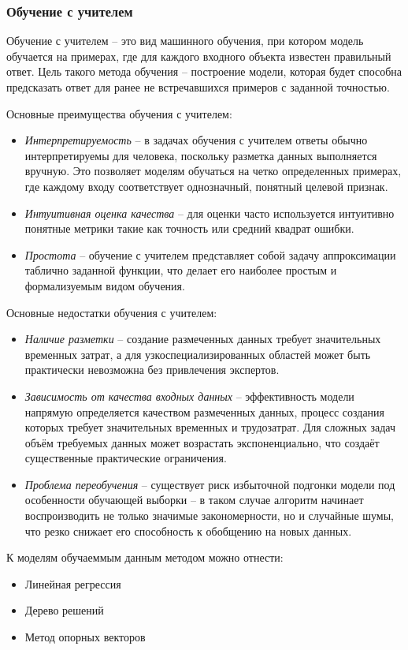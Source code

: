 \documentclass[../part_1.tex]{subfiles}
\begin{document}
\subsubsection{Обучение с учителем}
    \label{sec:with_teacher}
    \par Обучение с учителем -- это вид машинного обучения, при котором модель обучается на примерах, где для каждого входного объекта известен правильный ответ. Цель такого метода обучения -- построение модели, которая будет способна предсказать ответ для ранее не встречавшихся примеров с заданной точностью.
    \par Основные преимущества обучения с учителем:
    \begin{itemize}
        \item \textit{Интерпретируемость} -- в задачах обучения с учителем ответы обычно интерпретируемы для человека, поскольку разметка данных выполняется вручную. Это позволяет моделям обучаться на четко определенных примерах, где каждому входу соответствует однозначный, понятный целевой признак.
        \item \textit{Интуитивная оценка качества} -- для оценки часто используется интуитивно понятные метрики такие как точность или средний квадрат ошибки. 
        \item \textit{Простота} -- обучение с учителем представляет собой задачу аппроксимации таблично заданной функции, что делает его наиболее простым и формализуемым видом обучения.
    \end{itemize}
    \par Основные недостатки обучения с учителем:
    \begin{itemize}
        \item \textit{Наличие разметки} -- создание размеченных данных требует значительных временных затрат, а для узкоспециализированных областей может быть практически невозможна без привлечения экспертов.
        \item \textit{Зависимость от качества входных данных} -- эффективность модели напрямую определяется качеством размеченных данных, процесс создания которых требует значительных временных и трудозатрат. Для сложных задач объём требуемых данных может возрастать экспоненциально, что создаёт существенные практические ограничения.
        \item \textit{Проблема переобучения} -- существует риск избыточной подгонки модели под особенности обучающей выборки -- в таком случае алгоритм начинает воспроизводить не только значимые закономерности, но и случайные шумы, что резко снижает его способность к обобщению на новых данных.
    \end{itemize}
    \par К моделям обучаеммым данным методом можно отнести:
    \begin{itemize}
        \item Линейная регрессия\cite{linearregression}
        \item Дерево решений\cite{dessisiontree}
        \item Метод опорных векторов\cite{svm}
    \end{itemize}
    
\end{document}
